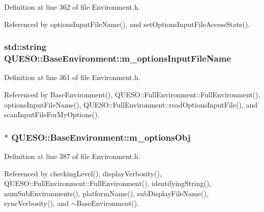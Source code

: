 Definition at line 362 of file Environment.\-h.



Referenced by options\-Input\-File\-Name(), and set\-Options\-Input\-File\-Access\-State().

\hypertarget{class_q_u_e_s_o_1_1_base_environment_a37195909442a817980e1cf8392b9e63d}{
\subsubsection[{m\-\_\-options\-Input\-File\-Name}]{\setlength{\rightskip}{0pt plus 5cm}std\-::string Q\-U\-E\-S\-O\-::\-Base\-Environment\-::m\-\_\-options\-Input\-File\-Name\hspace{0.3cm}{\ttfamily [protected]}}}\label{class_q_u_e_s_o_1_1_base_environment_a37195909442a817980e1cf8392b9e63d}


Definition at line 361 of file Environment.\-h.



Referenced by Base\-Environment(), Q\-U\-E\-S\-O\-::\-Full\-Environment\-::\-Full\-Environment(), options\-Input\-File\-Name(), Q\-U\-E\-S\-O\-::\-Full\-Environment\-::read\-Options\-Input\-File(), and scan\-Input\-File\-For\-My\-Options().

\hypertarget{class_q_u_e_s_o_1_1_base_environment_aa91c7ac0ab11472bafb0ae4ac36d2194}{
\subsubsection[{m\-\_\-options\-Obj}]{$\ast$ Q\-U\-E\-S\-O\-::\-Base\-Environment\-::m\-\_\-options\-Obj\hspace{0.3cm}{\ttfamily [protected]}}}\label{class_q_u_e_s_o_1_1_base_environment_aa91c7ac0ab11472bafb0ae4ac36d2194}


Definition at line 387 of file Environment.\-h.



Referenced by checking\-Level(), display\-Verbosity(), Q\-U\-E\-S\-O\-::\-Full\-Environment\-::\-Full\-Environment(), identifying\-String(), num\-Sub\-Environments(), platform\-Name(), sub\-Display\-File\-Name(), sync\-Verbosity(), and $\sim$\-Base\-Environment().

